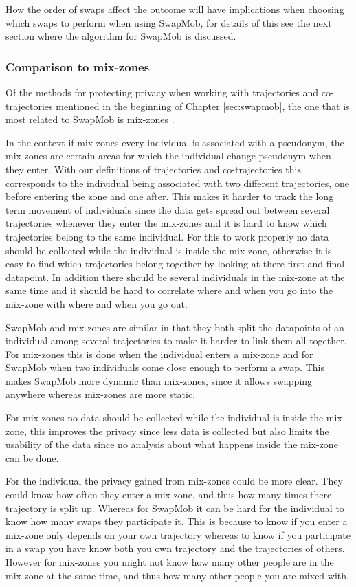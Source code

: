 \documentclass[12pt]{article}
\theoremstyle{definition}
\begin{document}
How the order of swaps affect the outcome will have implications when
choosing which swaps to perform when using SwapMob, for details of
this see the next section where the algorithm for SwapMob is
discussed.

\subsubsection{Comparison to mix-zones}
\label{sec:compare-mix-zones}
Of the methods for protecting privacy when working with trajectories
and co-trajectories mentioned in the beginning of Chapter
\ref{sec:swapmob}, the one that is most related to SwapMob is
mix-zones \cite{beresford_location_2003, beresford_mix_2004}.

In the context if mix-zones every individual is associated with a
pseudonym, the mix-zones are certain areas for which the individual
change pseudonym when they enter. With our definitions of trajectories
and co-trajectories this corresponds to the individual being
associated with two different trajectories, one before entering the
zone and one after. This makes it harder to track the long term
movement of individuals since the data gets spread out between several
trajectories whenever they enter the mix-zones and it is hard to know
which trajectories belong to the same individual. For this to work
properly no data should be collected while the individual is inside
the mix-zone, otherwise it is easy to find which trajectories belong
together by looking at there first and final datapoint. In addition
there should be several individuals in the mix-zone at the same time
and it should be hard to correlate where and when you go into the
mix-zone with where and when you go out.

SwapMob and mix-zones are similar in that they both split the
datapoints of an individual among several trajectories to make it
harder to link them all together. For mix-zones this is done when the
individual enters a mix-zone and for SwapMob when two individuals come
close enough to perform a swap. This makes SwapMob more dynamic than
mix-zones, since it allows swapping anywhere whereas mix-zones are
more static.

For mix-zones no data should be collected while the individual is
inside the mix-zone, this improves the privacy since less data is
collected but also limits the usability of the data since no analysis
about what happens inside the mix-zone can be done.

For the individual the privacy gained from mix-zones could be more
clear. They could know how often they enter a mix-zone, and thus how
many times there trajectory is split up. Whereas for SwapMob it can be
hard for the individual to know how many swaps they participate it.
This is because to know if you enter a mix-zone only depends on your
own trajectory whereas to know if you participate in a swap you have
know both you own trajectory and the trajectories of others. However
for mix-zones you might not know how many other people are in the
mix-zone at the same time, and thus how many other people you are
mixed with.
\end{document}
